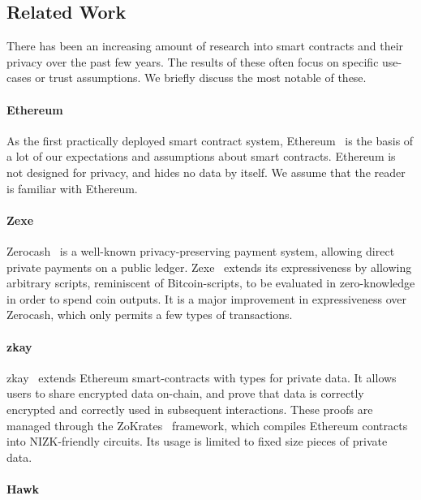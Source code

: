 \subsection{Related Work}
\label{sec:relatedwork}

There has been an increasing amount of research into smart contracts and their
privacy over the past few years. The results of these often focus on specific
use-cases or trust assumptions. We briefly discuss the most notable of
these.

\paragraph{Ethereum}

As the first practically deployed smart contract system,
Ethereum~\cite{ethereum} is the basis of a lot of our expectations and
assumptions about smart contracts. Ethereum is not designed for privacy, and
hides no data by itself. We assume that the reader is familiar with Ethereum.

\paragraph{Zexe}

Zerocash~\cite{SP:BCGGMT14} is a well-known privacy-preserving payment system,
allowing direct private payments on a public ledger. Zexe~\cite{zexe} extends
its expressiveness by allowing arbitrary scripts, reminiscent of
Bitcoin-scripts, to be evaluated in zero-knowledge in order to spend coin
outputs.
It is a major improvement in expressiveness over Zerocash, which only permits a
few types of transactions.

\paragraph{zkay}

zkay~\cite{CCS:SBGMTV19} extends Ethereum smart-contracts with types for private
data. It allows users to share encrypted data on-chain, and prove that data is
correctly encrypted and correctly used in subsequent interactions. These proofs
are managed through the ZoKrates~\cite{zokrates} framework, which compiles
Ethereum contracts into NIZK-friendly circuits. Its usage is limited to
fixed size pieces of private data.

\paragraph{Hawk}

